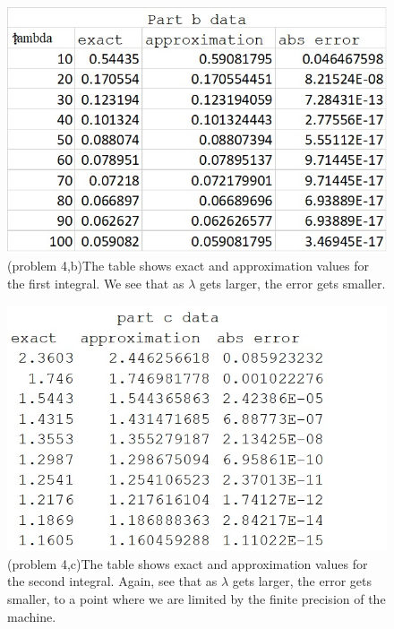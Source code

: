 \documentclass[12pt,letterpaper]{article}
\begin{document}
\begin{figure}[h]
    \centering
    \includegraphics{problem4/hw3_4_b.jpg}
    \caption{(problem 4,b)The table shows exact and approximation values for the first integral. We see that as $\lambda$ gets larger, the error gets smaller. }
    \label{fig:ftab1}
\end{figure}

\begin{figure}[h]
    \centering
    \includegraphics{problem4/hw3_4_c.jpg}
    \caption{(problem 4,c)The table shows exact and approximation values for the second integral. Again, see that as $\lambda$ gets larger, the error gets smaller, to a point where we are limited by the finite precision of the machine. }
    \label{fig:ftab1}
\end{figure}
\end{document}

